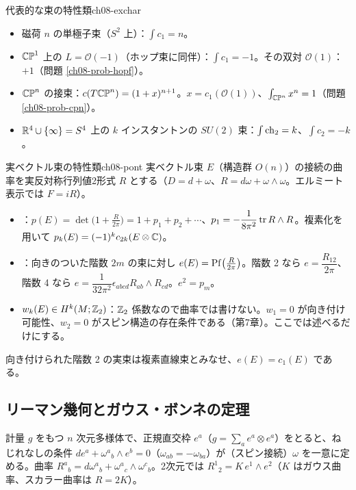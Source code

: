 \begin{myex}{代表的な束の特性類}{ch08-exchar}
\begin{itemize}
\item 磁荷 $n$ の単極子束（$S^2$ 上）：$\int c_1=n$。
\item $\mathbb{CP}^1$ 上の $L=\mathcal O(-1)$（ホップ束に同伴）：$\int c_1=-1$。その双対 $\mathcal O(1)$：$+1$（問題 \ref{ch08-prob-hopf}）。
\item $\mathbb{CP}^n$ の接束：$c(T\mathbb{CP}^n)=(1+x)^{n+1}$。$x=c_1(\mathcal O(1))$、$\int_{\mathbb{CP}^n}x^n=1$（問題 \ref{ch08-prob-cpn}）。
\item $\mathbb{R}^4\cup\{\infty\}=S^4$ 上の $k$ インスタントンの $SU(2)$ 束：$\int\operatorname{ch}_2=k$、$\int c_2=-k$。
\end{itemize}
\end{myex}

\begin{mydef}{実ベクトル束の特性類}{ch08-pont}
実ベクトル束 $E$（構造群 $O(n)$）の接続の曲率を実反対称行列値2形式 $R$ とする（$D=d+\omega$、$R=d\omega+\omega\wedge\omega$。エルミート表示では $F=iR$）。
\begin{itemize}
\item {}：$p(E)=\det\bigl(1+\tfrac{R}{2\pi}\bigr)=1+p_1+p_2+\cdots$、$p_1=-\dfrac{1}{8\pi^2}\tr R\wedge R$。複素化を用いて $p_k(E)=(-1)^kc_{2k}(E\otimes\mathbb{C})$。
\item {}：向きのついた階数 $2m$ の束に対し $e(E)=\operatorname{Pf}\bigl(\tfrac{R}{2\pi}\bigr)$。階数 2 なら $e=\dfrac{R_{12}}{2\pi}$、階数 4 なら $e=\dfrac{1}{32\pi^2}\epsilon_{abcd}R_{ab}\wedge R_{cd}$。$e^2=p_m$。
\item {} $w_k(E)\in H^k(M;\mathbb{Z}_2)$：$\mathbb{Z}_2$ 係数なので曲率では書けない。$w_1=0$ が向き付け可能性、$w_2=0$ がスピン構造の存在条件である（第7章）。ここでは述べるだけにする。
\end{itemize}
向き付けられた階数 2 の実束は複素直線束とみなせ、$e(E)=c_1(E)$ である。
\end{mydef}

\subsection{リーマン幾何とガウス・ボンネの定理}
計量 $g$ をもつ $n$ 次元多様体で、正規直交枠 $e^a$（$g=\sum_ae^a\otimes e^a$）をとると、ねじれなしの条件 $de^a+\omega^a{}_b\wedge e^b=0$（$\omega_{ab}=-\omega_{ba}$）が（スピン接続）$\omega$ を一意に定める。曲率 $R^a{}_b=d\omega^a{}_b+\omega^a{}_c\wedge\omega^c{}_b$。2次元では $R^1{}_2=K\,e^1\wedge e^2$（$K$ はガウス曲率、スカラー曲率は $R=2K$）。

